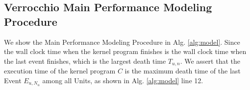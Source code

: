 \begin{table}[tp]
\caption{Verrocchio hardware parameter definitions of the Ascend 310 processors}
\label{tab:parameter}
\begin{center}

\end{center}
\end{table}

\subsection{Verrocchio Main Performance Modeling Procedure}

We show the Main Performance Modeling Procedure in Alg. \ref{alg:model}. Since the wall clock time when the kernel program finishes is the wall clock time when the last event finishes, which is the largest death time $T_{u, n}$. We assert that the execution time of the kernel program $C$ is the maximum death time of the last Event $E_{u, N_{u}}$ among all Units, as shown in Alg. \ref{alg:model} line 12. 

